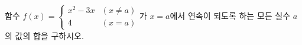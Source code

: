 함수 $f(x)=\begin{cases} x^2-3x & (x\ne a) \\ 4 & (x=a) \end{cases}$가 $x=a$에서 연속이 되도록 하는 모든 실수 $a$의 값의 합을 구하시오.
